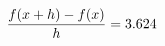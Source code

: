 \documentclass[preview]{standalone}
\begin{document}
\begin{align*}
\special{dvisvgm:raw <g id='unique000'>}\frac{f(x+h)-f(x)}{h} = 3.624\special{dvisvgm:raw </g>}
\end{align*}
\end{document}
